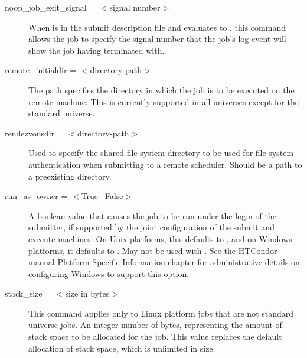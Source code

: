 \begin{description}

\label{man-condor-submit-noop-job-exit-signal}
\item[noop\_job\_exit\_signal = $<$signal number$>$]
When  is in the submit description file
and evaluates to ,
this command allows the job
to specify the signal number that the job's log event will show
the job having terminated with.


\label{man-condor-submit-remote-initialdir}
\item[remote\_initialdir = $<$directory-path$>$]
The path specifies the directory in which the job is to be
executed on the remote machine.  This is currently supported in all
universes except for the standard universe.


\label{man-condor-submit-rendezvousdir}
\item[rendezvousdir = $<$directory-path$>$] Used to specify the
shared file system directory to be used for file system authentication
when submitting to a remote scheduler.  Should be a path to a preexisting
directory.



\label{man-condor-submit-run-as-owner}
\item[run\_as\_owner = $<$True \Bar\ False$>$]
A boolean value that causes the job to be run under the login of 
the submitter,
if supported by the joint configuration of the submit and execute machines.
On Unix platforms, this defaults to ,
and on Windows platforms, it defaults to .
May not be used with .
See the HTCondor manual Platform-Specific Information chapter
for administrative details on
configuring Windows to support this option.


\label{man-condor-submit-stack-size}
\item[stack\_size = $<$size in bytes$>$]
This command applies only to Linux platform jobs that are not standard
universe jobs.
An integer number of bytes, representing the amount of stack space to be 
allocated for the job.
This value replaces the default allocation of stack space,
which is unlimited in size.


\end{description}
